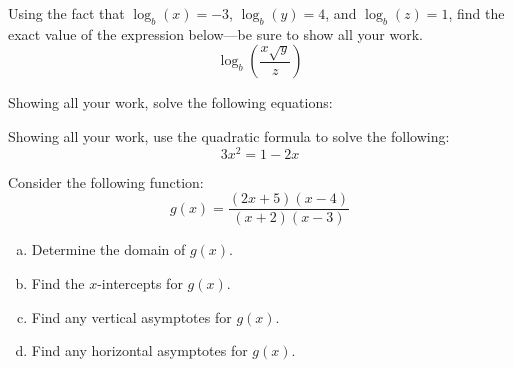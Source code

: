 \documentclass[12pt,letterpaper]{exam}
\begin{document}
\begin{questions}
\question[8] Using the fact that $\log_b(x)= -3$, $\log_b(y)= 4$, and $\log_b(z)= 1$, find the exact value of the expression below---be sure to show all your work.
	\[
	\log_b \left( \dfrac{x \sqrt{y}}{z} \right)
	\]
	


\newpage
\question[10] Showing all your work, solve the following equations: \par\vspace{0.5cm}



\newpage
\question[10] Showing all your work, use the quadratic formula to solve the following:	
	\[
	3x^2= 1 - 2x
	\]



\newpage
\question[8] Consider the following function:
	\[
	g(x)= \dfrac{(2x + 5)(x - 4)}{(x + 2)(x - 3)}
	\] \par\vspace{0.25cm}

\begin{enumerate}[(a)]
\item Determine the domain of $g(x)$. \vfill
\item Find the $x$-intercepts for $g(x)$. \vfill
\item Find any vertical asymptotes for $g(x)$. \vfill
\item Find any horizontal asymptotes for $g(x)$. \vfill
\end{enumerate}


\end{questions}
\end{document}

